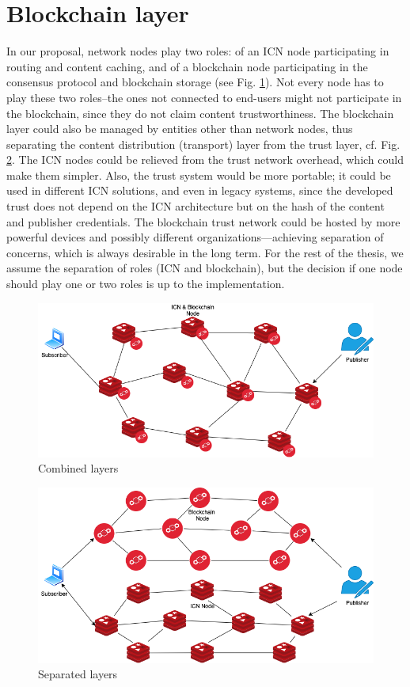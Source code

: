 \section{Blockchain layer}
In our proposal, network nodes play two roles: of an ICN node participating in routing and content caching, and of a blockchain node participating in the consensus protocol and blockchain storage (see Fig. \ref{fig:combined_layers}). Not every node has to play these two roles--the ones not connected to end-users might not participate in the blockchain, since they do not claim content trustworthiness. 
The blockchain layer could also be managed by entities other than network nodes, thus separating the content distribution (transport) layer from the trust layer, cf. Fig. \ref{fig:separated_layers}. The ICN nodes could be relieved from the trust network overhead, which could make them simpler. Also, the trust system would be more portable; it could be used in different ICN solutions, and even in legacy systems, since the developed trust does not depend on the ICN architecture but on the hash of the content and publisher credentials. The blockchain trust network could be hosted by more powerful devices and possibly different organizations––achieving separation of concerns, which is always desirable in the long term. For the rest of the thesis, we assume the separation of roles (ICN and blockchain), but the decision if one node should play one or two roles is up to the implementation.
\begin{figure}[h!]
\centering
\includegraphics[width=1\textwidth]{img/combined-layers.png}
\caption{Combined layers}
\label{fig:combined_layers}
\end{figure}

\begin{figure}[h!]
\centering
\includegraphics[width=1\textwidth]{img/separated-layers.png}
\caption{Separated layers}
\label{fig:separated_layers}
\end{figure}

